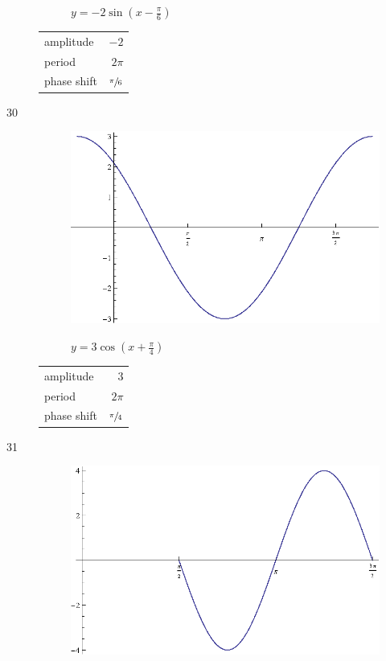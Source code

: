 \documentclass{exam}
\begin{document}
\begin{description}
\begin{figure}[H]
          $y = - 2 \sin \left( x - \frac{\pi}{6} \right)$
        \end{figure}

        \begin{tabular}[H]{lr}
          \toprule
          amplitude   & $-2$ \\
          period      & $2 \pi$ \\
          phase shift & $\sfrac{\pi}{6}$ \\
          \bottomrule
        \end{tabular}

      \item[30]
        \begin{figure}[H]
          \centering
          \includegraphics[scale=0.8]{exercise30.eps}

          $y = 3 \cos \left( x + \frac{\pi}{4} \right)$
        \end{figure}

        \begin{tabular}[H]{lr}
          \toprule
          amplitude   & $3$ \\
          period      & $2 \pi$ \\
          phase shift & $\sfrac{\pi}{4}$ \\
          \bottomrule
        \end{tabular}

      \item[31]
        \begin{figure}[H]
          \centering
          \includegraphics[scale=0.8]{exercise31.eps}


\end{figure}
\end{description}
\end{document}
